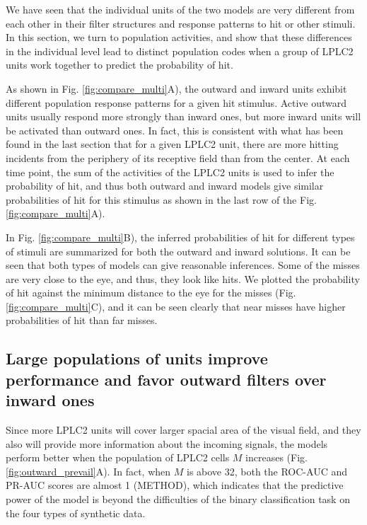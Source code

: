 \documentclass[pdftex,9pt,lineno]{elife}
\begin{document}
We have seen that the individual units of the two models are very different from each other in their filter structures and response patterns to hit or other stimuli. In this section, we turn to population activities, and show that these differences in the individual level lead to distinct population codes when a group of LPLC2 units work together to predict the probability of hit.

As shown in Fig. \ref{fig:compare_multi}A), the outward and inward units exhibit different population response patterns for a given hit stimulus. Active outward units usually respond more strongly than inward ones, but more inward units will be activated than outward ones. In fact, this is consistent with what has been found in the last section that for a given LPLC2 unit, there are more hitting incidents from the periphery of its receptive field than from the center. At each time point, the sum of the activities of the LPLC2 units is used to infer the probability of hit, and thus both outward and inward models give similar probabilities of hit for this stimulus as shown in the last row of the Fig. \ref{fig:compare_multi}A).

In Fig. \ref{fig:compare_multi}B), the inferred probabilities of hit for different types of stimuli are summarized for both the outward and inward solutions. It can be seen that both types of models can give reasonable inferences. Some of the misses are very close to the eye, and thus, they look like hits. We plotted the probability of hit against the minimum distance to the eye for the misses (Fig. \ref{fig:compare_multi}C), and it can be seen clearly that near misses have higher probabilities of hit than far misses.


\subsection{Large populations of units improve performance and favor outward filters over inward ones}




Since more LPLC2 units will cover larger spacial area of the visual field, and they also will provide more information about the incoming signals, the models perform better when the population of LPLC2 cells $M$ increases (Fig. \ref{fig:outward_prevail}A). In fact, when $M$ is above 32, both the ROC-AUC and PR-AUC scores are almost 1 (METHOD), which indicates that the predictive power of the model is beyond the difficulties of the binary classification task on the four types of synthetic data.
\end{document}

